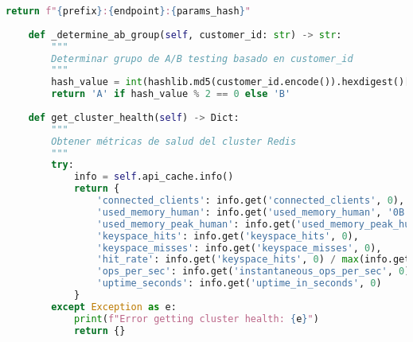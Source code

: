 \begin{lstlisting}[language=python, caption=Implementación de Patrones de Caché Avanzados, label=lst:redis_patterns]
        return f"{prefix}:{endpoint}:{params_hash}"
    
    def _determine_ab_group(self, customer_id: str) -> str:
        """
        Determinar grupo de A/B testing basado en customer_id
        """
        hash_value = int(hashlib.md5(customer_id.encode()).hexdigest()[:8], 16)
        return 'A' if hash_value % 2 == 0 else 'B'
    
    def get_cluster_health(self) -> Dict:
        """
        Obtener métricas de salud del cluster Redis
        """
        try:
            info = self.api_cache.info()
            return {
                'connected_clients': info.get('connected_clients', 0),
                'used_memory_human': info.get('used_memory_human', '0B'),
                'used_memory_peak_human': info.get('used_memory_peak_human', '0B'),
                'keyspace_hits': info.get('keyspace_hits', 0),
                'keyspace_misses': info.get('keyspace_misses', 0),
                'hit_rate': info.get('keyspace_hits', 0) / max(info.get('keyspace_hits', 0) + info.get('keyspace_misses', 0), 1),
                'ops_per_sec': info.get('instantaneous_ops_per_sec', 0),
                'uptime_seconds': info.get('uptime_in_seconds', 0)
            }
        except Exception as e:
            print(f"Error getting cluster health: {e}")
            return {}
\end{lstlisting} 